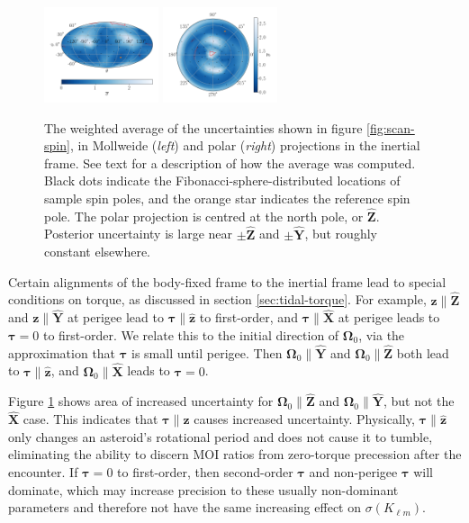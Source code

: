 \documentclass[fleqn,usenatbib]{mnras}
\newcommand{\unit}[1]{\bm{\hat{#1}}}
\begin{document}
\begin{figure}
  \centering
  \includegraphics[width=0.3\textwidth]{figs/spin-pole-avg-mollweide.png}
  \includegraphics[width=0.3\textwidth]{figs/spin-pole-avg-polar.png}
  \caption{The weighted average of the uncertainties shown in figure \ref{fig:scan-spin}, in Mollweide (\textit{left}) and polar (\textit{right}) projections in the inertial frame. See text for a description of how the average was computed. Black dots indicate the Fibonacci-sphere-distributed locations of sample spin poles, and the orange star indicates the reference spin pole. The polar projection is centred at the north pole, or $\unit Z$. Posterior uncertainty is large near $\pm \unit Z$ and $\pm \unit Y$, but roughly constant elsewhere.}
  \label{fig:scan-spin-avg}
\end{figure}

Certain alignments of the body-fixed frame to the inertial frame lead to special conditions on torque, as discussed in section \ref{sec:tidal-torque}. For example, $\bm z \parallel \unit Z$ and $\bm z \parallel \unit Y$ at perigee lead to $\bm \tau \parallel \unit z$ to first-order, and $\bm \tau \parallel \unit X$ at perigee leads to $\bm \tau = 0$ to first-order. We relate this to the initial direction of $\bm \Omega_0$, via the approximation that $\bm \tau$ is small until perigee. Then $\bm \Omega_0 \parallel \unit Y$ and $\bm \Omega_0 \parallel \unit Z$ both lead to $\bm \tau \parallel \unit z$, and $\bm \Omega_0 \parallel \unit X$ leads to $\bm \tau = 0$.

Figure \ref{fig:scan-spin-avg} shows area of increased uncertainty for $\bm \Omega_0 \parallel \unit Z$ and $\bm \Omega_0 \parallel \unit Y$, but not the $\unit X$ case. This indicates that $\bm \tau \parallel \unit z$ causes increased uncertainty. Physically, $\bm \tau \parallel \unit z$ only changes an asteroid's rotational period and does not cause it to tumble, eliminating the ability to discern MOI ratios from zero-torque precession after the encounter. If $\bm \tau = 0$ to first-order, then second-order $\bm \tau$ and non-perigee $\bm \tau$ will dominate, which may increase precision to these usually non-dominant parameters and therefore not have the same increasing effect on $\sigma(K_{\ell m})$.
\end{document}
